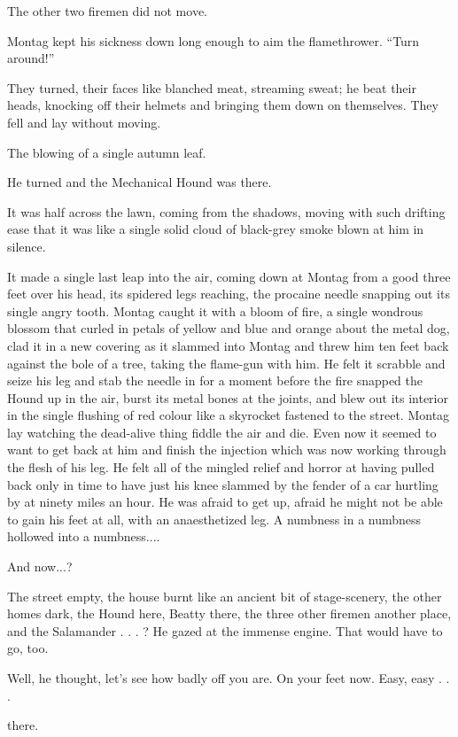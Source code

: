 \documentclass[11pt,openany]{book}
\begin{document}
The other two firemen did not move.

Montag kept his sickness down long enough to aim the flamethrower. ``Turn around!''

They turned, their faces like blanched meat, streaming sweat; he beat their heads, knocking off their helmets and bringing them down on themselves. They fell and lay without moving.

The blowing of a single autumn leaf.

He turned and the Mechanical Hound was there.

It was half across the lawn, coming from the shadows, moving with such drifting ease that it was like a single solid cloud of black-grey smoke blown at him in silence.

It made a single last leap into the air, coming down at Montag from a good three feet over his head, its spidered legs reaching, the procaine needle snapping out its single angry tooth. Montag caught it with a bloom of fire, a single wondrous blossom that curled in petals of yellow and blue and orange about the metal dog, clad it in a new covering as it slammed into Montag and threw him ten feet back against the bole of a tree, taking the flame-gun with him. He felt it scrabble and seize his leg and stab the needle in for a moment before the fire snapped the Hound up in the air, burst its metal bones at the joints, and blew out its interior in the single flushing of red colour like a skyrocket fastened to the street. Montag lay watching the dead-alive thing fiddle the air and die. Even now it seemed to want to get back at him and finish the injection which was now working through the flesh of his leg. He felt all of the mingled relief and horror at having pulled back only in time to have just his knee slammed by the fender of a car hurtling by at ninety miles an hour. He was afraid to get up, afraid he might not be able to gain his feet at all, with an anaesthetized leg. A numbness in a numbness hollowed into a numbness....

And now...?

The street empty, the house burnt like an ancient bit of stage-scenery, the other homes dark, the Hound here, Beatty there, the three other firemen another place, and the Salamander . . . ? He gazed at the immense engine. That would have to go, too.

Well, he thought, let's see how badly off you are. On your feet now. Easy, easy . . .

there.
\end{document}
